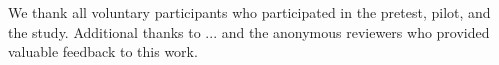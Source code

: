 \begin{acks}
We thank all voluntary participants who participated in the pretest, pilot, and the study. Additional thanks to ... and the anonymous reviewers who provided valuable feedback to this work.
\end{acks}